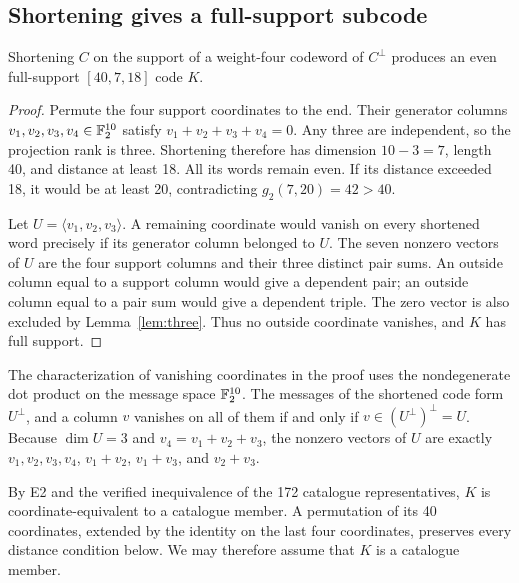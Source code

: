 \subsection{Shortening gives a full-support subcode}
\begin{lemma}\label{lem:mother}
Shortening $C$ on the support of a weight-four codeword of $C^\perp$ produces an even full-support $[40,7,18]$ code $K$.
\end{lemma}
\begin{proof}
Permute the four support coordinates to the end. Their generator columns $v_1,v_2,v_3,v_4\in\mathbb F_2^{10}$ satisfy $v_1+v_2+v_3+v_4=0$. Any three are independent, so the projection rank is three. Shortening therefore has dimension $10-3=7$, length 40, and distance at least 18. All its words remain even. If its distance exceeded 18, it would be at least 20, contradicting $g_2(7,20)=42>40$.

Let $U=\langle v_1,v_2,v_3\rangle$. A remaining coordinate would vanish on every shortened word precisely if its generator column belonged to $U$. The seven nonzero vectors of $U$ are the four support columns and their three distinct pair sums. An outside column equal to a support column would give a dependent pair; an outside column equal to a pair sum would give a dependent triple. The zero vector is also excluded by Lemma~\ref{lem:three}. Thus no outside coordinate vanishes, and $K$ has full support.
\end{proof}
The characterization of vanishing coordinates in the proof uses the nondegenerate dot product on the message space $\mathbb F_2^{10}$. The messages of the shortened code form $U^\perp$, and a column $v$ vanishes on all of them if and only if $v\in(U^\perp)^\perp=U$. Because $\dim U=3$ and $v_4=v_1+v_2+v_3$, the nonzero vectors of $U$ are exactly $v_1,v_2,v_3,v_4$, $v_1+v_2$, $v_1+v_3$, and $v_2+v_3$.

By E2 and the verified inequivalence of the 172 catalogue representatives, $K$ is coordinate-equivalent to a catalogue member. A permutation of its 40 coordinates, extended by the identity on the last four coordinates, preserves every distance condition below. We may therefore assume that $K$ is a catalogue member.

